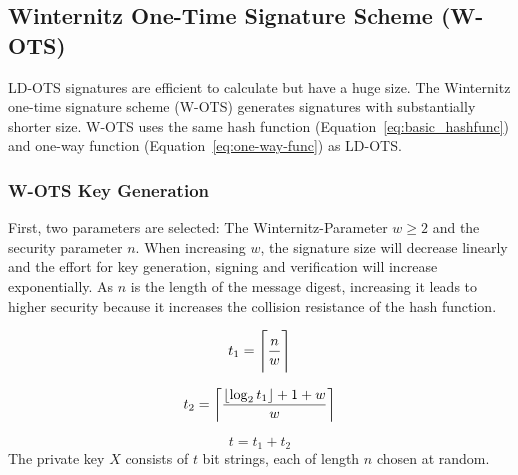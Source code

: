 
\subsection{Winternitz One-Time Signature Scheme (W-OTS)}
LD-OTS signatures are efficient to calculate but have a huge size. %
The Winternitz one-time signature scheme (W-OTS) generates signatures with substantially shorter size. W-OTS uses the same hash function (Equation~\ref{eq:basic_hashfunc}) and one-way function (Equation~\ref{eq:one-way-func}) as LD-OTS. %

\subsubsection{W-OTS Key Generation}
\label{sec:WOTS_keygen}
First, two parameters are selected: The Winternitz-Parameter $w \geq 2$ and the security parameter $n$. When increasing $w$, the signature size will decrease linearly and the effort for key generation, signing and verification will increase exponentially. As $n$ is the length of the message digest, increasing it leads to higher security because it increases the collision resistance of the hash function. %

\begin{equation}
\label{eq:t1}
t_1 = \ceil[\Bigg]{\frac{n}{w}}
\end{equation}

\begin{equation}
\label{eq:t2}
t_2 = \ceil*{\frac{\floor*{\log_2 t_1} + 1 + w}{w} }
\end{equation}

\begin{equation}
\label{eq:t}
t = t_1 + t_2
\end{equation}
The private key $X$ consists of $t$ bit strings, each of length $n$ chosen at random.

